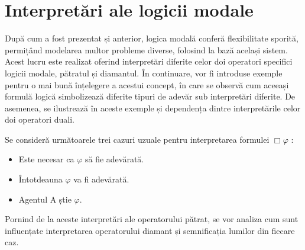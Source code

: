 \documentclass[12pt, openany]{book}
\begin{document}
        \section{Interpretări ale logicii modale} %
        \label{section_engineering}
            \par{}
                După cum a fost prezentat și anterior, logica modală conferă flexibilitate sporită, permițând modelarea multor
                probleme diverse, folosind la bază același sistem. Acest lucru este realizat oferind interpretări diferite 
                celor doi operatori specifici logicii modale, pătratul și diamantul. În continuare, vor fi introduse exemple
                pentru o mai bună înțelegere a acestui concept, în care se observă cum aceeași formulă logică simbolizează
                diferite tipuri de adevăr sub interpretări diferite. De asemenea, se ilustrează în aceste exemple și dependența
                dintre interpretările celor doi operatori duali.

            \par{}
                Se consideră următoarele trei cazuri uzuale pentru interpretarea formulei $\Box\varphi$ \cite{lecture_notes_hedin}:
                \begin{itemize}
                    \item Este necesar ca $\varphi$ să fie adevărată.
                    \item Întotdeauna $\varphi$ va fi adevărată.
                    \item Agentul A știe $\varphi$.
                \end{itemize}
                Pornind de la aceste interpretări ale operatorului pătrat, se vor analiza cum sunt influențate interpretarea 
                operatorului diamant și semnificația lumilor din fiecare caz.
\end{document}
